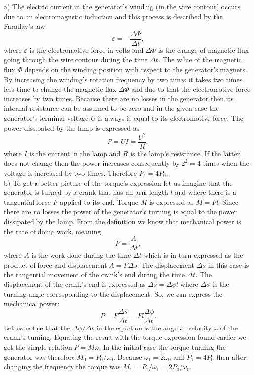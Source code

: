 \documentclass[11pt]{article}
\begin{document}
\solueng
a) The electric current in the generator’s winding (in the wire contour) occurs due to an electromagnetic induction and this process is described by the Faraday’s law
$$
\varepsilon = -\frac{\Delta\Phi}{\Delta t},
$$
where $\varepsilon$ is the electromotive force in volts and $\Delta\Phi$ is the change of magnetic flux going through the wire contour during the time $\Delta t$. The value of the magnetic flux $\Phi$ depends on the winding position with respect to the generator’s magnets. By increasing the winding’s rotation frequency by two times it takes two times less time to change the magnetic flux $\Delta\Phi$ and due to that the electromotive force increases by two times. Because there are no losses in the generator then its internal resistance can be assumed to be zero and in the given case the generator’s terminal voltage $U$ is always is equal to its electromotive force. The power dissipated by the lamp is expressed as 
$$
P = UI = \frac{U^2}{R},
$$
where $I$ is the current in the lamp and $R$ is the lamp’s resistance. If the latter does not change then the power increases consequently by $2^2=4$ times when the voltage is increased by two times. Therefore $P_1=4P_0$.\\
b) To get a better picture of the torque’s expression let us imagine that the generator is turned by a crank that has an arm length $l$ and where there is a tangential force $F$ applied to its end. Torque $M$ is expressed as $M=Fl$. Since there are no losses the power of the generator’s turning is equal to the power dissipated by the lamp. From the definition we know that mechanical power is the rate of doing work, meaning
$$
P = \frac{A}{\Delta t},
$$
where $A$ is the work done during the time $\Delta t$ which is in turn expressed as the product of force and displacement $A=F \Delta s$. The displacement $\Delta s$ in this case is the tangential movement of the crank’s end during the time $\Delta t$. The displacement of the crank’s end is expressed as $\Delta s=\Delta\phi l$ where $\Delta\phi$ is the turning angle corresponding to the displacement. So, we can express the mechanical power:
$$
P = F \frac{\Delta s}{\Delta t} =Fl \frac{\Delta\phi}{\Delta t}.
$$
Let us notice that the $\Delta\phi / \Delta t$ in the equation is the angular velocity $\omega$ of the crank’s turning. Equating the result with the torque expression found earlier we get the simple relation $P=M\omega$. In the initial case the torque turning the generator was therefore $M_0 = P_0/\omega_0$. Because $\omega_1=2\omega_0$ and $P_1=4P_0$ then after changing the frequency the torque was $M_1 = P_1/\omega_1=2P_0/\omega_0$.
\probend
\bigskip
\end{document}
